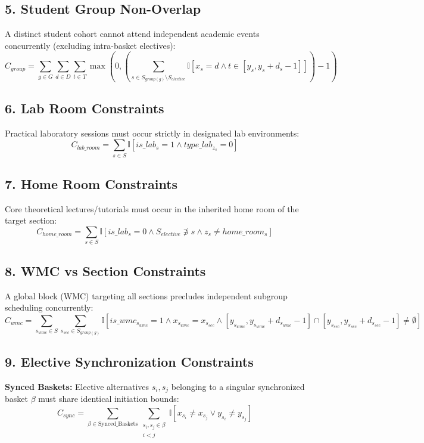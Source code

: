 \documentclass[12pt,a4paper]{article}
\begin{document}
\subsection{5. Student Group Non-Overlap}
A distinct student cohort cannot attend independent academic events concurrently (excluding intra-basket electives):
\begin{equation}
    C_{group} = \sum_{g \in G} \sum_{d \in D} \sum_{t \in T} \max\left(0, \left(\sum_{s \in S_{group(g)} \setminus S_{elective}} \mathbb{I}[x_s = d \land t \in [y_s, y_s + d_s - 1]]\right) - 1\right)
\end{equation}

\subsection{6. Lab Room Constraints}
Practical laboratory sessions must occur strictly in designated lab environments:
\begin{equation}
    C_{lab\_room} = \sum_{s \in S} \mathbb{I}[is\_lab_s = 1 \land type\_lab_{z_s} = 0]
\end{equation}

\subsection{7. Home Room Constraints}
Core theoretical lectures/tutorials must occur in the inherited home room of the target section:
\begin{equation}
    C_{home\_room} = \sum_{s \in S} \mathbb{I}[is\_lab_s = 0 \land S_{elective} \not\ni s \land z_s \neq home\_room_s]
\end{equation}

\subsection{8. WMC vs Section Constraints}
A global block (WMC) targeting all sections precludes independent subgroup scheduling concurrently:
\begin{equation}
    C_{wmc} = \sum_{s_{wmc} \in S} \sum_{s_{sec} \in S_{group(g)}} \mathbb{I}[is\_wmc_{s_{wmc}} = 1 \land x_{s_{wmc}} = x_{s_{sec}} \land [y_{s_{wmc}}, y_{s_{wmc}} + d_{s_{wmc}} - 1] \cap [y_{s_{sec}}, y_{s_{sec}} + d_{s_{sec}} - 1] \neq \emptyset]
\end{equation}

\subsection{9. Elective Synchronization Constraints}
\textbf{Synced Baskets:} Elective alternatives $s_i, s_j$ belonging to a singular synchronized basket $\beta$ must share identical initiation bounds:
\begin{equation}
    C_{sync} = \sum_{\beta \in \text{Synced\_Baskets}} \sum_{\substack{s_i, s_j \in \beta \\ i < j}} \mathbb{I}[x_{s_i} \neq x_{s_j} \lor y_{s_i} \neq y_{s_j}]
\end{equation}
\end{document}

